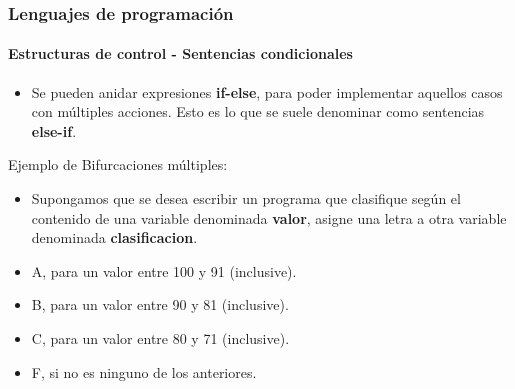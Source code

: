 \documentclass{beamer}
\begin{document}
\begin{frame}
  \frametitle{Lenguajes de programación}
  \framesubtitle{Estructuras de control - Sentencias condicionales}

  \begin{itemize}
  \item Se pueden anidar expresiones \textbf{if-else}, para poder implementar aquellos casos con múltiples acciones. Esto es lo que se suele denominar como sentencias \textbf{else-if}.
  \end{itemize}

  \begin{block}{Ejemplo de Bifurcaciones múltiples:}
    \begin{itemize}
    \item Supongamos que se desea escribir un programa que clasifique según el contenido de una variable denominada \textbf{valor}, asigne una letra a otra variable denominada \textbf{clasificacion}.
    \item A, para un valor entre 100 y 91 (inclusive).
    \item B, para un valor entre 90 y 81 (inclusive).
    \item C, para un valor entre 80 y 71 (inclusive).
    \item F, si no es ninguno de los anteriores.
    \end{itemize}
  \end{block}
\end{frame}
\end{document}
